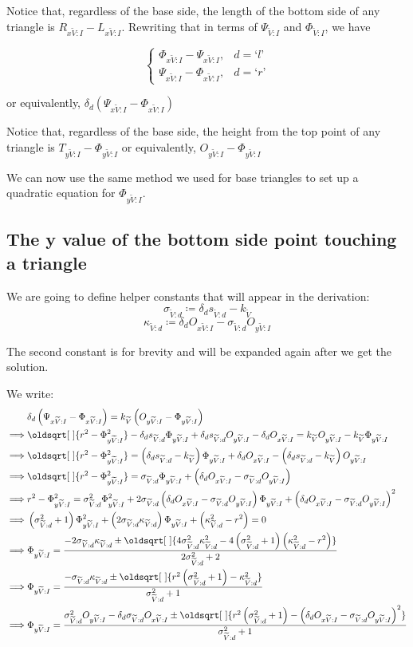 \documentclass[a4paper,12pt]{article}
\newcommand{\HSindexpart}[1]{\text{`}#1\text{'}}
\newcommand{\HSview}[1][V]{\widetilde{#1}}
\newcommand{\HSLx}[1][I]{L_{x\HSview:#1}}
\newcommand{\HSRx}[1][I]{R_{x\HSview:#1}}
\newcommand{\HSTy}[1][I]{T_{y\HSview:#1}}
\newcommand{\HSPSI}[1][I]{\Psi_{\HSview:#1}}
\newcommand{\HSPSIx}[1][I]{\Psi_{x\HSview:#1}}
\newcommand{\HSPHI}[1][I]{\Phi_{\HSview:#1}}
\newcommand{\HSPHIx}[1][I]{\Phi_{x\HSview:#1}}
\newcommand{\HSPHIy}[1][I]{\Phi_{y\HSview:#1}}
\newcommand{\HSOx}[1][I]{O_{x\HSview:#1}}
\newcommand{\HSOy}[1][I]{O_{y\HSview:#1}}
\newcommand{\HSk}{k_{\HSview}}
\newcommand{\HSdelta}[1][d]{\delta_{#1}}
\newcommand{\HSs}[1][d]{s_{\HSview:#1}}
\newcommand{\HSsigma}[1][d]{\sigma_{\HSview:#1}}
\newcommand{\HSkappa}[1][d]{\kappa_{\HSview:#1}}
\renewcommand*{\sqrt}[2][\ ]{\oldsqrt[#1]{#2} }
\theoremstyle{definition}
\theoremstyle{plain}
\begin{document}
	Notice that, regardless of the base side, the length of the bottom side of any triangle is $\HSRx - \HSLx$.
	Rewriting that in terms of $\HSPSI$ and $\HSPHI$, we have

	$$\begin{cases}
		\HSPHIx - \HSPSIx, & d = \HSindexpart{l}\\\HSPSIx - \HSPHIx, & d = \HSindexpart{r}
	\end{cases}$$

	or equivalently, $\delta_d\left(\HSPSIx - \HSPHIx\right)$

	Notice that, regardless of the base side, the height from the top point of any triangle is $\HSTy - \HSPHIy$ or equivalently,
	$\HSOy - \HSPHIy$

	We can now use the same method we used for base triangles to set up a quadratic equation for $\HSPHIy$.
	\newpage
	\subsection{The y value of the bottom side point touching a triangle}
	
	We are going to define helper constants that will appear in the derivation:
	$$\HSsigma \coloneqq \HSdelta \HSs - \HSk$$
	$$\HSkappa \coloneqq \HSdelta \HSOx - \HSsigma \HSOy$$

	The second constant is for brevity and will be expanded again after we get the solution.

	We write:
	\begin{align*}
		         & \HSdelta \left( \HSPSIx - \HSPHIx \right) = \HSk \left( \HSOy - \HSPHIy \right)\\
		\implies & \sqrt{r^2 - \HSPHIy^2} - \HSdelta \HSs \HSPHIy + \HSdelta \HSs \HSOy - \HSdelta \HSOx = \HSk \HSOy - \HSk \HSPHIy\\
		\implies & \sqrt{r^2 - \HSPHIy^2} = \left(\HSdelta \HSs - \HSk\right)\HSPHIy + \HSdelta\HSOx - \left(\HSdelta \HSs - \HSk\right)\HSOy\\
		\implies & \sqrt{r^2 - \HSPHIy^2} = \HSsigma \HSPHIy + \left(\HSdelta\HSOx - \HSsigma\HSOy\right)\\
		\implies & r^2 - \HSPHIy^2 = \HSsigma^2 \HSPHIy^2 + 2 \HSsigma\left(\HSdelta\HSOx - \HSsigma\HSOy\right)\HSPHIy + \left(\HSdelta\HSOx - \HSsigma\HSOy\right)^2\\
		\implies & \left(\HSsigma^2 + 1\right)\HSPHIy^2 + \left(2\HSsigma\HSkappa\right)\HSPHIy + \left(\HSkappa^2 - r^2\right) = 0\\
		\implies &\HSPHIy = \frac{-2\HSsigma\HSkappa \pm \sqrt{4\HSsigma^2\HSkappa^2 - 4\left(\HSsigma^2 + 1\right)\left(\HSkappa^2 - r^2\right)}}{2\HSsigma^2 + 2}\\
		\implies &\HSPHIy = \frac{-\HSsigma\HSkappa \pm \sqrt{r^2\left(\HSsigma^2 + 1\right) - \HSkappa^2}}{\HSsigma^2 + 1}\\
		\implies &\HSPHIy = \frac{\HSsigma^2\HSOy - \HSdelta\HSsigma\HSOx \pm \sqrt{r^2\left(\HSsigma^2 + 1\right) - \left(\HSdelta \HSOx - \HSsigma \HSOy\right)^2}}{\HSsigma^2 + 1}\\
	\end{align*}
\end{document}
